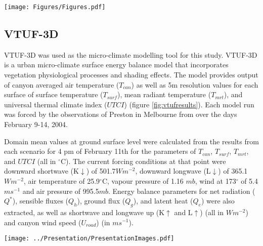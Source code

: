 \documentclass[final,3p,times,authoryear]{elsarticle}
\begin{document}
\begin{figure*}
\centering
\texttt{[image: Figures/Figures.pdf]}
\caption{\bf Melbourne, creation of VTUF-3D scenarios for 9814 variations of parameters.}
 \label{fig:scenarios}
\end{figure*} 






\subsection{VTUF-3D}\label{sec:methodsvtuf}
VTUF-3D \citep{Nice2018a} was used as the micro-climate modelling tool for this study. VTUF-3D is a urban micro-climate surface energy balance model that incorporates vegetation physiological processes and shading effects. The model provides output of canyon averaged air temperature ($T_{can}$) as well as 5m resolution values for each surface of surface temperature ($T_{surf}$), mean radiant temperature ($T_{mrt}$), and universal thermal climate index ($UTCI$) (figure \ref{fig:vtufresults}). Each model run was forced by the observations of Preston in Melbourne from \cite{Coutts2007} over the days February 9-14, 2004. 

Domain mean values at ground surface level were calculated from the results from each scenario for 4 pm of February 11th for the parameters of $T_{can}$, $T_{surf}$, $T_{mrt}$, and $UTCI$ (all in $^{\circ}$C). The current forcing conditions at that point were downward shortwave (K$\downarrow$) of 501.7$Wm^{-2}$, downward longwave (L$\downarrow$) of 365.1$Wm^{-2}$, air temperature of 25.9$^{\circ}$C, vapour pressure of 1.16 $mb$, wind at 173$^{\circ}$ of 5.4 $ms^{-1}$ and air pressure of 995.5$mb$. Energy balance parameters for net radiation ($Q^{*}$), sensible fluxes ($Q_{h}$), ground flux ($Q_{g}$), and latent heat ($Q_{e}$) were also extracted, as well as shortwave and longwave up (K$\uparrow$ and L$\uparrow$) (all in $Wm^{-2}$) and canyon wind speed ($U_{road}$) (in $ms^{-1}$).

\begin{figure*}
\centering
\texttt{[image: ../Presentation/PresentationImages.pdf]}
\caption{\bf Melbourne, VTUF-3D results.}
 \label{fig:vtufresults}
\end{figure*} 
\end{document}
